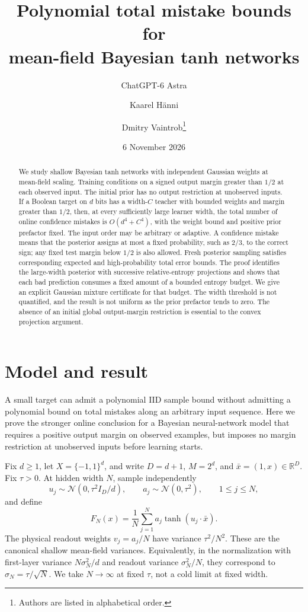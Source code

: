 \documentclass[11pt]{article}
\title{Polynomial total mistake bounds for\protect\\mean-field Bayesian tanh networks}
\author{ChatGPT-6 Astra \and Kaarel H\"anni \and Dmitry Vaintrob\thanks{Authors are listed in alphabetical order.}}
\date{6 November 2026}
\newcommand{\R}{\mathbb R}
\begin{document}
\maketitle

\begin{abstract}
We study shallow Bayesian tanh networks with independent Gaussian weights
at mean-field scaling. Training conditions on a signed output margin
greater than $1/2$ at each observed input. The initial prior has no output
restriction at unobserved inputs. If a Boolean target on $d$ bits has a
width-$C$ teacher with bounded weights and margin greater than $1/2$,
then, at every sufficiently large learner width, the total number of
online confidence mistakes is $O(d^4+C^4)$, with the weight bound and
positive prior prefactor fixed. The input order may be arbitrary or
adaptive. A confidence mistake means that the posterior assigns at most
a fixed probability, such as $2/3$, to the correct sign; any fixed test
margin below $1/2$ is also allowed. Fresh posterior sampling satisfies
corresponding expected and high-probability total error bounds.
The proof identifies the large-width posterior with successive
relative-entropy projections and shows that each bad prediction consumes
a fixed amount of a bounded entropy budget. We give an explicit Gaussian
mixture certificate for that budget. The width threshold is not
quantified, and the result is not uniform as the prior prefactor tends to
zero. The absence of an initial global output-margin restriction is
essential to the convex projection argument.
\end{abstract}

\section{Model and result}

A small target can admit a polynomial IID sample bound without admitting
a polynomial bound on total mistakes along an arbitrary input sequence.
Here we prove the stronger online conclusion for a Bayesian neural-network
model that requires a positive output margin on observed examples, but
imposes no margin restriction at unobserved inputs before learning starts.

Fix $d\ge1$, let $X=\{-1,1\}^d$, and write $D=d+1$, $M=2^d$, and
$\bar x=(1,x)\in\R^D$. Fix $\tau>0$. At hidden width $N$, sample
independently
\begin{equation}\label{eq:prior}
 u_j\sim\mathcal N(0,\tau^2 I_D/d),\qquad
 a_j\sim\mathcal N(0,\tau^2),\qquad 1\le j\le N,
\end{equation}
and define
\begin{equation}\label{eq:network}
 F_N(x)=\frac1N\sum_{j=1}^N a_j\tanh(u_j\cdot\bar x).
\end{equation}
The physical readout weights $v_j=a_j/N$ have variance $\tau^2/N^2$.
These are the canonical shallow mean-field variances. Equivalently, in
the normalization with first-layer variance $N\sigma_N^2/d$ and readout
variance $\sigma_N^2/N$, they correspond to $\sigma_N=\tau/\sqrt N$.
We take $N\to\infty$ at fixed $\tau$, not a cold limit at fixed width.
\end{document}

